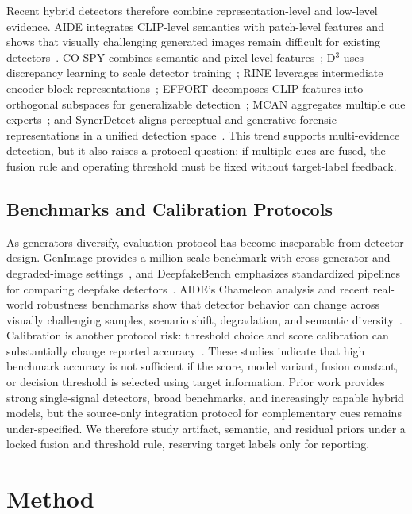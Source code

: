 \documentclass[lettersize,journal]{IEEEtran}
\begin{document}
Recent hybrid detectors therefore combine representation-level and low-level evidence. AIDE integrates CLIP-level semantics with patch-level features and shows that visually challenging generated images remain difficult for existing detectors~\cite{yan2025aide}. CO-SPY combines semantic and pixel-level features~\cite{cheng2025cospy}; D$^3$ uses discrepancy learning to scale detector training~\cite{yang2025d3}; RINE leverages intermediate encoder-block representations~\cite{koutlis2024rine}; EFFORT decomposes CLIP features into orthogonal subspaces for generalizable detection~\cite{yan2024effort}; MCAN aggregates multiple cue experts~\cite{tan2026mcan}; and SynerDetect aligns perceptual and generative forensic representations in a unified detection space~\cite{li2026synerdetect}. This trend supports multi-evidence detection, but it also raises a protocol question: if multiple cues are fused, the fusion rule and operating threshold must be fixed without target-label feedback.

\subsection{Benchmarks and Calibration Protocols}
As generators diversify, evaluation protocol has become inseparable from detector design. GenImage provides a million-scale benchmark with cross-generator and degraded-image settings~\cite{zhu2023genimage}, and DeepfakeBench emphasizes standardized pipelines for comparing deepfake detectors~\cite{yan2023deepfakebench}. AIDE's Chameleon analysis and recent real-world robustness benchmarks show that detector behavior can change across visually challenging samples, scenario shift, degradation, and semantic diversity~\cite{yan2025aide,li2025rrdataset}. Calibration is another protocol risk: threshold choice and score calibration can substantially change reported accuracy~\cite{yang2026calibrated}. These studies indicate that high benchmark accuracy is not sufficient if the score, model variant, fusion constant, or decision threshold is selected using target information. Prior work provides strong single-signal detectors, broad benchmarks, and increasingly capable hybrid models, but the source-only integration protocol for complementary cues remains under-specified. We therefore study artifact, semantic, and residual priors under a locked fusion and threshold rule, reserving target labels only for reporting.

\section{Method}
\label{sec:method}
\end{document}

